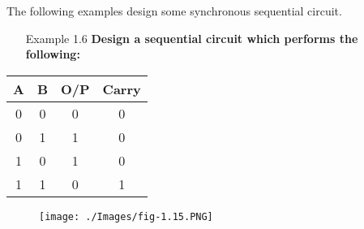 \documentclass[10.5pt]{article}
\begin{document}
\clearpage
\noindent The following examples design some synchronous sequential circuit.
\begin{enumerate}
		\item[Example 1.6] \textbf{Design a sequential circuit which performs the following:}
\end{enumerate}

\begin{center}
	\begin{tabular}{ c c c c } 		
		\hline
		A & B & O/P & Carry \\
		\hline
		0 & 0 & 0 & 0\\
		\hline
		0 & 1 & 1 & 0\\
		\hline
		1 & 0 & 1 & 0\\
		\hline
		1 & 1 & 0 & 1\\
		\hline
	\end{tabular}
\end{center}
\begin{wrapfigure}{!h!}{0.5\textwidth}
	\begin{center}	
		\texttt{[image: ./Images/fig-1.15.PNG]}
			\caption{}
  	\end{center}
\end{wrapfigure}
\end{document}
